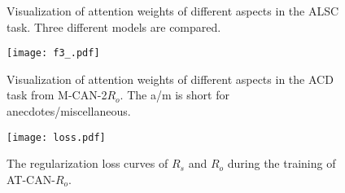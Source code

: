 \documentclass[11pt,a4paper]{article}
\begin{document}
\begin{table}[t!]
\setlength{\abovecaptionskip}{0.0cm}   %
\setlength{\belowcaptionskip}{-0.2cm}   %
\begin{center}
\end{center}
\caption{\label{table-st} Results of the ALSC task in terms of accuracy ($\%$). All methods are run in single-task settings.}	
\end{table}

\begin{figure}
\setlength{\abovecaptionskip}{0.1cm}   %
\setlength{\belowcaptionskip}{-0.2cm}   %
\centering
{}
\vspace{-5pt}
\vspace{-5pt}
\caption{Visualization of attention weights of different aspects in the ALSC task. Three different models are compared.}
\label{compare-att}
\end{figure}

\begin{figure}
\setlength{\abovecaptionskip}{0.1cm}   %
\setlength{\belowcaptionskip}{-0.4cm}   %
\centering
\texttt{[image: f3\_.pdf]}
\caption{Visualization of attention weights of different aspects in the ACD task from M-CAN-2$R_o$. The a/m is short for anecdotes/miscellaneous.} 
  \label{ACD-att} 
\end{figure}

\begin{figure}
\setlength{\abovecaptionskip}{0.1cm}   %
\setlength{\belowcaptionskip}{-0.5cm}   %
\centering
\texttt{[image: loss.pdf]}
\caption{The regularization loss curves of $R_s$ and $R_o$ during the training of AT-CAN-$R_o$.} 
  \label{figure:reg-loss} 
\end{figure}
\end{document}
